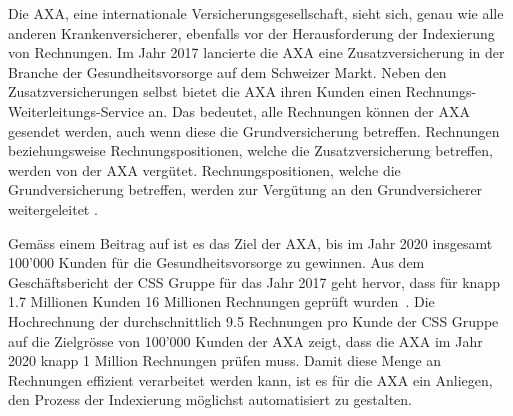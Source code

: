 


Die AXA, eine internationale Versicherungsgesellschaft, sieht sich, genau wie alle anderen Krankenversicherer, ebenfalls vor der Herausforderung der Indexierung von Rechnungen. Im Jahr 2017 lancierte die AXA eine Zusatzversicherung in der Branche der Gesundheitsvorsorge auf dem Schweizer Markt. Neben den Zusatzversicherungen selbst bietet die AXA ihren Kunden einen Rechnungs-Weiterleitungs-Service an. Das bedeutet, alle Rechnungen können der AXA gesendet werden, auch wenn diese die Grundversicherung betreffen. Rechnungen beziehungsweise Rechnungspositionen, welche die Zusatzversicherung betreffen, werden von der AXA vergütet. Rechnungspositionen, welche die Grundversicherung betreffen, werden zur Vergütung an den Grundversicherer weitergeleitet \autocite{Finanzen.ch2017}.

Gemäss einem Beitrag auf \textcite{Finanzen.ch2017} ist es das Ziel der AXA, bis im Jahr 2020 insgesamt 100'000 Kunden für die Gesundheitsvorsorge zu gewinnen. Aus dem Geschäftsbericht der CSS Gruppe für das Jahr 2017 geht hervor, dass für knapp 1.7 Millionen Kunden 16 Millionen Rechnungen geprüft wurden~\autocite{CSSGruppe2018}. Die Hochrechnung der durchschnittlich 9.5 Rechnungen pro Kunde der CSS Gruppe auf die Zielgrösse von 100'000 Kunden der AXA zeigt, dass die AXA im Jahr 2020 knapp 1 Million Rechnungen prüfen muss. Damit diese Menge an Rechnungen effizient verarbeitet werden kann, ist es für die AXA ein Anliegen, den Prozess der Indexierung möglichst automatisiert zu gestalten.

